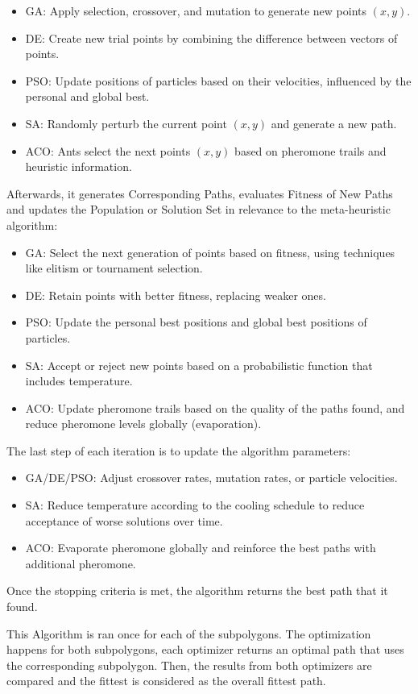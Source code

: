 \begin{itemize}
    \item GA: Apply selection, crossover, and mutation to generate new points $(x, y)$.
    \item DE: Create new trial points by combining the difference between vectors of points.
    \item PSO: Update positions of particles based on their velocities, influenced by the personal and global best.
    \item SA: Randomly perturb the current point $(x, y)$ and generate a new path.
    \item ACO: Ants select the next points $(x, y)$ based on pheromone trails and heuristic information.
\end{itemize}
Afterwards, it generates Corresponding Paths, evaluates Fitness of New Paths and updates the Population or Solution Set
in relevance to the meta-heuristic algorithm: 
\begin{itemize}
    \item GA: Select the next generation of points based on fitness, using techniques like elitism or tournament selection.
    \item DE: Retain points with better fitness, replacing weaker ones.
    \item PSO: Update the personal best positions and global best positions of particles.
    \item SA: Accept or reject new points based on a probabilistic function that includes temperature.
    \item ACO: Update pheromone trails based on the quality of the paths found, and reduce pheromone levels globally (evaporation).
\end{itemize}
The last step of each iteration is to update the algorithm parameters:
\begin{itemize}
    \item GA/DE/PSO: Adjust crossover rates, mutation rates, or particle velocities.
    \item SA: Reduce temperature according to the cooling schedule to reduce acceptance of worse solutions over time.
    \item ACO: Evaporate pheromone globally and reinforce the best paths with additional pheromone.
\end{itemize}
Once the stopping criteria is met, the algorithm returns the best path that it found.

This Algorithm is ran once for each of the subpolygons. The optimization happens for both subpolygons, each 
optimizer returns an optimal path that uses the corresponding subpolygon.
Then, the results from both optimizers are compared and the fittest is considered as the overall
fittest path. 

